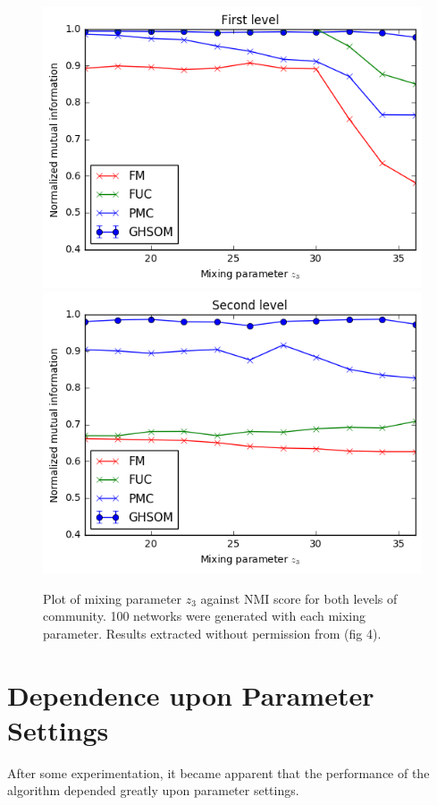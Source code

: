 \documentclass{report}
\begin{document}
	\begin{figure}
		\centering
		\includegraphics[width=\textwidth]{../first_level.png}
		\includegraphics[width=\textwidth]{../second_level.png}
		\caption{Plot of mixing parameter $z_3$ against NMI score for both levels of community. 100 networks were generated with each mixing parameter. Results extracted without permission from \protect\cite{yang2013hierarchical} (fig 4).}
		\label{synthetic_experiment}
	\end{figure}
	
	\section{Dependence upon Parameter Settings}
	After some experimentation, it became apparent that the performance of the algorithm depended greatly upon parameter settings. 
	
\end{document}
